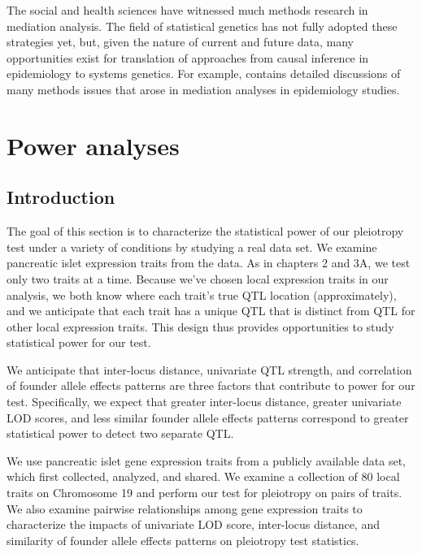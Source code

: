 \documentclass[oneside]{book}\usepackage[]{graphicx}\usepackage[]{color}
\begin{document}
The social and health sciences have witnessed much methods research in mediation analysis. 
The field of statistical genetics has not fully adopted these strategies yet, but, given the
nature of current and future data, many opportunities exist for translation of approaches from
causal inference in epidemiology to systems genetics. 
For example, \citet{vanderweele2015explanation} contains detailed discussions of many methods
issues that arose in mediation analyses in
epidemiology studies.




\section{Power analyses}

\subsection{Introduction}

The goal of this section is to characterize the statistical power of our pleiotropy test under a variety of conditions by studying a real data set. 
We examine pancreatic islet expression traits from the \citet{keller2018genetic} data. 
As in chapters 2 and 3A, we test only two traits at a time. 
Because we’ve chosen local expression traits in our analysis, we both know where each trait’s true QTL location (approximately), 
and we anticipate that each trait has a unique QTL that is distinct from QTL for other local expression traits. 
This design thus provides opportunities to study statistical power for our test.

We anticipate that inter-locus distance, univariate QTL strength, and correlation of founder allele effects patterns are three factors that contribute to power for our test. 
Specifically, we expect that greater inter-locus distance, greater univariate LOD scores, and less similar founder allele effects patterns correspond to greater statistical power to detect two separate QTL.

We use pancreatic islet gene expression traits from a publicly available data set, which \citet{keller2018genetic} first collected, analyzed, and shared. 
We examine a collection of 80 local traits on Chromosome 19 and perform our test for pleiotropy on pairs of traits. 
We also examine pairwise relationships among gene expression traits to characterize the impacts of univariate LOD score, 
inter-locus distance, and similarity of founder allele effects patterns on pleiotropy test statistics.
\end{document}
